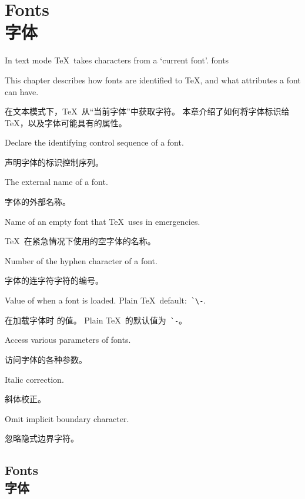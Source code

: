 

\endofchapter
\chapter{Fonts\\字体}\label{font}

In text mode \TeX\ takes characters from a `current font'.
\term fonts\par
This chapter describes how fonts are identified to \TeX,
and what attributes a font can have.

在文本模式下，\TeX\ 从“当前字体”中获取字符。
本章介绍了如何将字体标识给 \TeX，以及字体可能具有的属性。


\begin{inventory}
\item [\cs{font}] 
      Declare the identifying control sequence of a font.

      声明字体的标识控制序列。
\item [\cs{fontname}] 
      The external name of a font.

      字体的外部名称。
\item [\cs{nullfont}] 
      Name of an empty font that \TeX\ uses in emergencies.

      \TeX\ 在紧急情况下使用的空字体的名称。
\item [\cs{hyphenchar}] 
      Number of the hyphen character of a font.

      字体的连字符字符的编号。
\item [\cs{defaulthyphenchar}] 
      Value of  when a font is loaded.
      Plain \TeX\ default:~\verb>`\->.

      在加载字体时  的值。
Plain \TeX\ 的默认值为~\verb>`->。
\item [\cs{fontdimen}] 
      Access various parameters of fonts.

      访问字体的各种参数。
\item [\cs{char47}]
      Italic correction.

      斜体校正。
\item [\cs{noboundary}] 
      Omit implicit boundary character.

      忽略隐式边界字符。
\end{inventory}



\section{Fonts\\字体}

